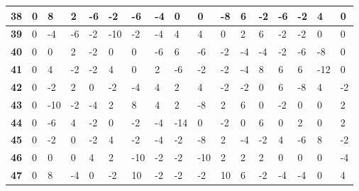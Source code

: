 \begin{longtable}[c]{|l|l|l|l|l|l|l|l|l|l|l|l|l|l|l|l|l|}
\textbf{38} & 0          & 8          & 2          & -6         & -2         & -6         & -4         & 0          & 0          & -8         & 6           & -2          & -6          & -2          & 4           & 0           \\ \hline
\textbf{39} & 0          & -4         & -6         & -2         & -10        & -2         & -4         & 4          & 4          & 0          & 2           & 6           & -2          & -2          & 0           & 0           \\ \hline
\textbf{40} & 0          & 0          & 2          & -2         & 0          & 0          & -6         & 6          & -6         & -2         & -4          & -4          & -2          & -6          & -8          & 0           \\ \hline
\textbf{41} & 0          & 4          & -2         & -2         & 4          & 0          & 2          & -6         & -2         & -2         & -4          & 8           & 6           & 6           & -12         & 0           \\ \hline
\textbf{42} & 0          & -2         & 2          & 0          & -2         & -4         & 4          & 2          & 4          & -2         & -2          & 0           & 6           & -8          & 4           & -2          \\ \hline
\textbf{43} & 0          & -10        & -2         & -4         & 2          & 8          & 4          & 2          & -8         & 2          & 6           & 0           & -2          & 0           & 0           & 2           \\ \hline
\textbf{44} & 0          & -6         & 4          & -2         & 0          & -2         & -4         & -14        & 0          & -2         & 0           & 6           & 0           & 2           & 0           & 2           \\ \hline
\textbf{45} & 0          & -2         & 0          & -2         & 4          & -2         & -4         & -2         & -8         & 2          & -4          & -2          & 4           & -6          & 8           & -2          \\ \hline
\textbf{46} & 0          & 0          & 0          & 4          & 2          & -10        & -2         & -2         & -10        & 2          & 2           & 2           & 0           & 0           & 0           & -4          \\ \hline
\textbf{47} & 0          & 8          & -4         & 0          & -2         & 10         & -2         & -2         & -2         & 10         & 6           & -2          & -4          & -4          & 0           & 4           \\ \hline

\end{longtable}
